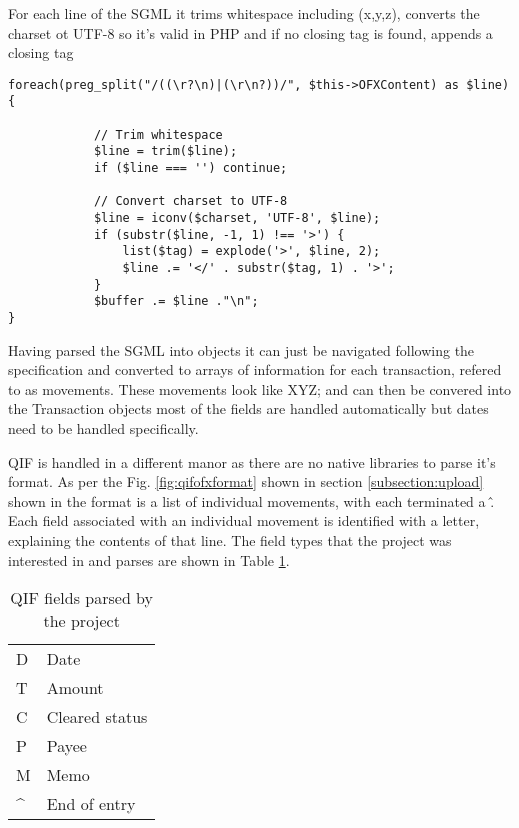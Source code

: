 

For each line of the SGML it trims whitespace including (x,y,z), converts the charset ot UTF-8 so it's valid in PHP and if no closing tag is found, appends a closing tag

\lstset{style=phpcolor}
\begin{lstlisting}
foreach(preg_split("/((\r?\n)|(\r\n?))/", $this->OFXContent) as $line){
        		
        	// Trim whitespace
        	$line = trim($line);
        	if ($line === '') continue;
        
        	// Convert charset to UTF-8
        	$line = iconv($charset, 'UTF-8', $line);
        	if (substr($line, -1, 1) !== '>') {
        		list($tag) = explode('>', $line, 2);
        		$line .= '</' . substr($tag, 1) . '>';
        	}
        	$buffer .= $line ."\n";
}
\end{lstlisting}

Having parsed the SGML into objects it can just be navigated following the specification and converted to arrays of information for each transaction, refered to as movements. These movements look like XYZ; and can then be convered into the Transaction objects most of the fields are handled automatically but dates need to be handled specifically.

QIF is handled in a different manor as there are no native libraries to parse it's format. As per the Fig. \ref{fig:qifofxformat} shown in section \ref{subsection:upload} shown in  the format is a list of individual movements, with each terminated a \^. Each field associated with an individual movement is identified with a letter, explaining the contents of that line.
% 
The field types that the project was interested in and parses are shown in Table \ref{table:qiffields}.

\begin{table}[h]
\begin{tabular}{ll}
D                  & Date           \\
T                  & Amount         \\
C                  & Cleared status \\
P                  & Payee          \\
M                  & Memo           \\
\textasciicircum   & End of entry  
\end{tabular}
\caption{QIF fields parsed by the project}
\label{table:qiffields}
\end{table}

